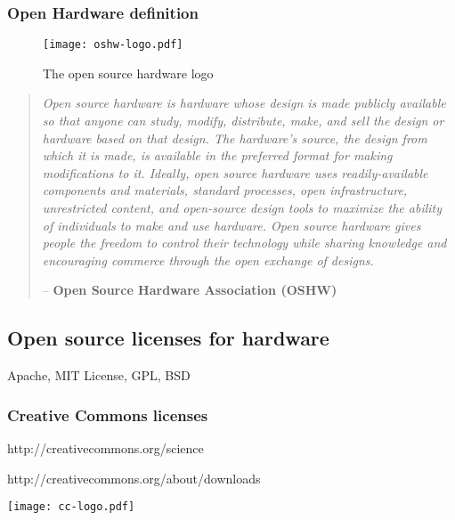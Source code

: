 \subsubsection{Open Hardware definition} %

\begin{figure}[]
    \begin{center}
        \texttt{[image: oshw-logo.pdf]}
    \end{center}
    \caption{The open source hardware logo}
    \label{fig:ohw-logo}
\end{figure}

\begin{quotation}
  \emph{Open source hardware is hardware whose design is made publicly available so that anyone can study, modify, distribute, make, and sell the design or hardware based on that design.
  The hardware’s source, the design from which it is made, is available in the preferred format for making modifications to it.
  Ideally, open source hardware uses readily-available components and materials, standard processes, open infrastructure, unrestricted content, and open-source design tools to maximize the ability of individuals to make and use hardware.
  Open source hardware gives people the freedom to control their technology while sharing knowledge and encouraging commerce through the open exchange of designs.}

  -- \textbf{Open Source Hardware Association (OSHW)}
\end{quotation}


\subsection{Open source licenses for hardware} %



Apache, MIT License, GPL, BSD
\subsubsection{Creative Commons licenses} %


http://creativecommons.org/science

http://creativecommons.org/about/downloads
\begin{NFfigure}
    \begin{center}
        \texttt{[image: cc-logo.pdf]}
    \end{center}
    \caption{Creative Commons logo}
    \label{fig:cc-logo}
\end{NFfigure}

